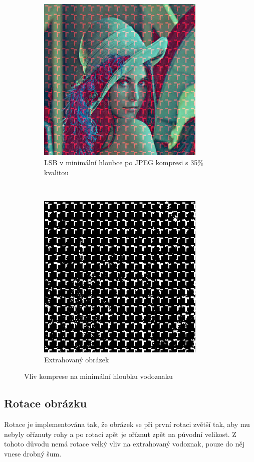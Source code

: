 \begin{figure}[h!]
    \begin{center}
        \begin{subfigure}[t]{0.5\textwidth}
            \centering
            \includegraphics[height=8cm]{images/lsb_0_35_qual.jpg}
            \caption{LSB v minimální hloubce po JPEG kompresi s 35\% kvalitou}
        \end{subfigure}%
        ~
        \begin{subfigure}[t]{0.5\textwidth}
            \centering
            \includegraphics[height=8cm]{images/lsb_0_35_qual_extracted.jpg}
            \caption{Extrahovaný obrázek}
        \end{subfigure}
        \caption{Vliv komprese na minimální hloubku vodoznaku}
    \end{center}
\end{figure}

\clearpage

\subsection[rotace]{Rotace obrázku}
Rotace je implementována tak, že obrázek se při první rotaci zvětší tak, aby mu nebyly oříznuty rohy a po rotaci zpět je oříznut zpět na původní velikost. Z tohoto důvodu nemá rotace velký vliv na extrahovaný vodoznak, pouze do něj vnese drobný šum.

